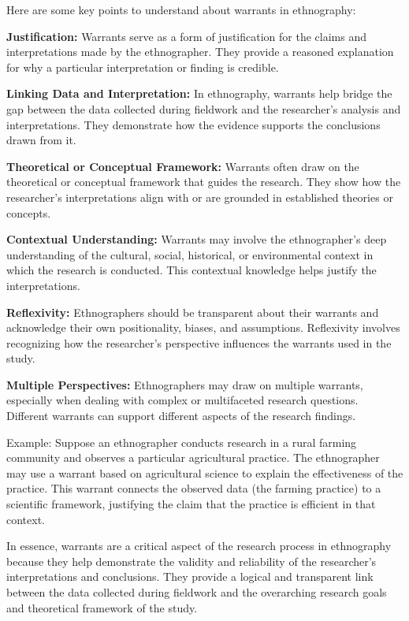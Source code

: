 \documentclass[
  b5paper]{book}
\begin{document}
Here are some key points to understand about warrants in ethnography:

\textbf{Justification:} Warrants serve as a form of justification for the claims and interpretations made by the ethnographer. They provide a reasoned explanation for why a particular interpretation or finding is credible.

\textbf{Linking Data and Interpretation:} In ethnography, warrants help bridge the gap between the data collected during fieldwork and the researcher's analysis and interpretations. They demonstrate how the evidence supports the conclusions drawn from it.

\textbf{Theoretical or Conceptual Framework:} Warrants often draw on the theoretical or conceptual framework that guides the research. They show how the researcher's interpretations align with or are grounded in established theories or concepts.

\textbf{Contextual Understanding:} Warrants may involve the ethnographer's deep understanding of the cultural, social, historical, or environmental context in which the research is conducted. This contextual knowledge helps justify the interpretations.

\textbf{Reflexivity:} Ethnographers should be transparent about their warrants and acknowledge their own positionality, biases, and assumptions. Reflexivity involves recognizing how the researcher's perspective influences the warrants used in the study.

\textbf{Multiple Perspectives:} Ethnographers may draw on multiple warrants, especially when dealing with complex or multifaceted research questions. Different warrants can support different aspects of the research findings.

Example: Suppose an ethnographer conducts research in a rural farming community and observes a particular agricultural practice. The ethnographer may use a warrant based on agricultural science to explain the effectiveness of the practice. This warrant connects the observed data (the farming practice) to a scientific framework, justifying the claim that the practice is efficient in that context.

In essence, warrants are a critical aspect of the research process in ethnography because they help demonstrate the validity and reliability of the researcher's interpretations and conclusions. They provide a logical and transparent link between the data collected during fieldwork and the overarching research goals and theoretical framework of the study.
\end{document}

